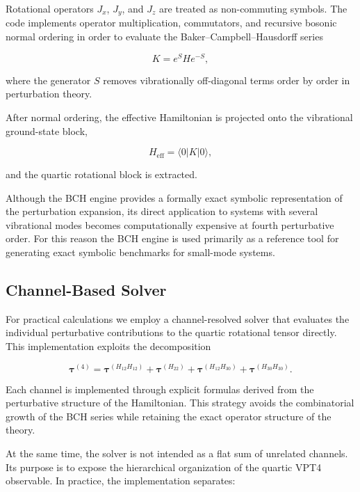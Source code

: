 \documentclass[aip,jcp,reprint]{revtex4-2}
\begin{document}
Rotational operators $J_x$, $J_y$, and $J_z$ are treated as
non-commuting symbols.
The code implements operator multiplication, commutators, and recursive
bosonic normal ordering in order to evaluate the Baker--Campbell--Hausdorff
series

\begin{equation}
K = e^S H e^{-S},
\end{equation}

where the generator $S$ removes vibrationally off-diagonal terms order
by order in perturbation theory.

After normal ordering, the effective Hamiltonian is projected onto the
vibrational ground-state block,

\begin{equation}
H_{\mathrm{eff}} = \langle 0 | K | 0 \rangle ,
\end{equation}

and the quartic rotational block is extracted.

Although the BCH engine provides a formally exact symbolic
representation of the perturbation expansion, its direct application
to systems with several vibrational modes becomes computationally
expensive at fourth perturbative order.
For this reason the BCH engine is used primarily as a reference tool
for generating exact symbolic benchmarks for small-mode systems.

\subsection{Channel-Based Solver}

For practical calculations we employ a channel-resolved solver that
evaluates the individual perturbative contributions to the quartic
rotational tensor directly.
This implementation exploits the decomposition

\begin{equation}
\bm{\tau}^{(4)} =
\bm{\tau}^{(H_{12}H_{12})}
+
\bm{\tau}^{(H_{22})}
+
\bm{\tau}^{(H_{12}H_{30})}
+
\bm{\tau}^{(H_{30}H_{30})}.
\end{equation}

Each channel is implemented through explicit formulas derived from the
perturbative structure of the Hamiltonian.
This strategy avoids the combinatorial growth of the BCH series while
retaining the exact operator structure of the theory.

At the same time, the solver is not intended as a flat sum of unrelated
channels. Its purpose is to expose the hierarchical organization of the
quartic VPT4 observable. In practice, the implementation separates:
\end{document}
